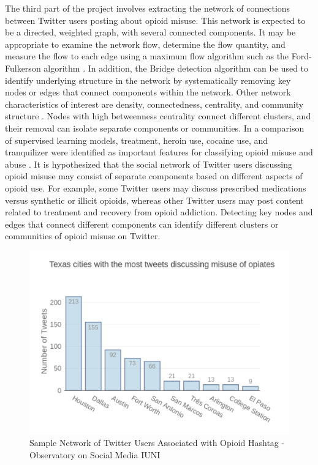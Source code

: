 \documentclass[sigconf]{acmart}
\begin{document}
The third part of the project involves extracting the network of connections 
between Twitter users posting about opioid misuse. This network is expected to 
be a directed, weighted graph, with several connected components. It may be 
appropriate to examine the network flow, determine the flow quantity, and 
measure the flow to each edge using a maximum flow algorithm such as the Ford-
Fulkerson algorithm \cite{zafarani14}. In addition, the Bridge detection 
algorithm can be used to identify underlying structure in the network by 
systematically removing key nodes or edges that connect components within the 
network. Other network characteristics of interest are density, connectedness, 
centrality, and community structure \cite{golbeck13}. Nodes with high 
betweenness centrality connect different clusters, and their removal can
isolate separate components or communities. In a comparison of supervised 
learning models, treatment, heroin use, cocaine use, and tranquilizer were 
identified as important features for classifying opioid misuse and abuse 
\cite{shiverick17}. It is hypothesized that the social network of Twitter 
users discussing opioid misuse may consist of separate components based on 
different aspects of opioid use. For example, some Twitter users may discuss 
prescribed medications versus synthetic or illicit opioids, whereas other 
Twitter users may post content related to treatment and recovery from opioid 
addiction. Detecting key nodes and edges that connect different components 
can identify different clusters or communities of opioid misuse on Twitter.

\begin{figure}[!ht]
  \centering\includegraphics[width=\columnwidth]{images/Figure1.pdf}
  \caption{Sample Network of Twitter Users Associated with Opioid Hashtag - 
  Observatory on Social Media IUNI}
  \label{f:Figure1}
\end{figure}
\end{document}
